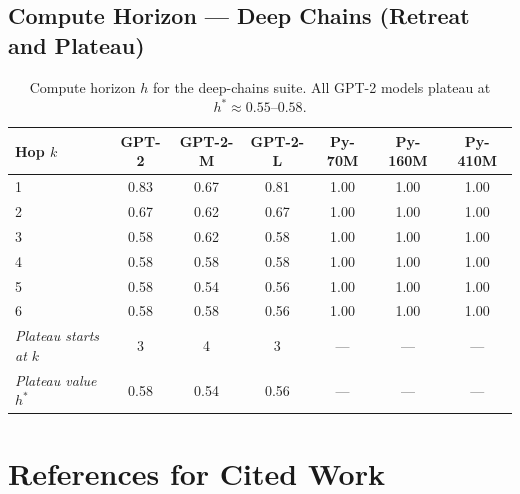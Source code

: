 \documentclass{article}
\begin{document}
\subsection{Compute Horizon — Deep Chains (Retreat and Plateau)}

\begin{table}[h]
\centering
\small
\begin{tabular}{lcccccc}
\toprule
\textbf{Hop $k$} & \textbf{GPT-2} & \textbf{GPT-2-M} & \textbf{GPT-2-L}
                 & \textbf{Py-70M} & \textbf{Py-160M} & \textbf{Py-410M} \\
\midrule
1 & 0.83 & 0.67 & 0.81 & 1.00 & 1.00 & 1.00 \\
2 & 0.67 & 0.62 & 0.67 & 1.00 & 1.00 & 1.00 \\
3 & 0.58 & 0.62 & 0.58 & 1.00 & 1.00 & 1.00 \\
4 & 0.58 & 0.58 & 0.58 & 1.00 & 1.00 & 1.00 \\
5 & 0.58 & 0.54 & 0.56 & 1.00 & 1.00 & 1.00 \\
6 & 0.58 & 0.58 & 0.56 & 1.00 & 1.00 & 1.00 \\
\midrule
\textit{Plateau starts at $k$} & 3 & 4 & 3 & — & — & — \\
\textit{Plateau value $h^*$}   & 0.58 & 0.54 & 0.56 & — & — & — \\
\bottomrule
\end{tabular}
\caption{Compute horizon $h$ for the deep-chains suite.
All GPT-2 models plateau at $h^* \approx 0.55$--$0.58$.}
\end{table}

\section{References for Cited Work}
\end{document}
